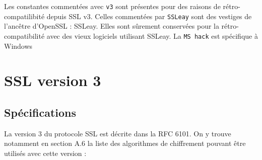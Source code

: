 \documentclass[a4paper,11pt,french]{article}
\begin{document}
Les constantes commentées avec \verb+v3+ sont présentes pour des raisons de rétro-compatilibité depuis SSL v3. Celles commentées par \verb+SSLeay+ sont des vestiges de l'ancêtre d'OpenSSL : SSLeay. Elles sont sûrement conservées pour la rétro-compatibilité avec des vieux logiciels utilisant SSLeay. La \verb+MS hack+ est spécifique à Windows

\pagebreak
\section{SSL version 3}
\subsection{Spécifications}
La version 3 du protocole SSL est décrite dans la RFC 6101. On y trouve notamment en section A.6 la liste des algorithmes de chiffrement pouvant être utilisés avec cette version :
\end{document}
